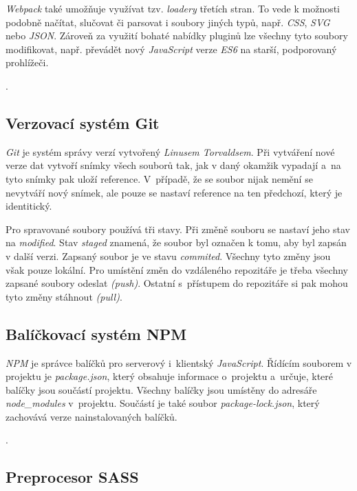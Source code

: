 \documentclass[a4paper,12pt]{article}
\begin{document}
\textit{Webpack} také umožňuje využívat tzv. \textit{loadery} třetích stran. To vede k možnosti podobně načítat, slučovat či parsovat i soubory jiných typů, např. \textit{CSS}, \textit{SVG} nebo \textit{JSON}. Zároveň za využití bohaté nabídky pluginů lze všechny tyto soubory modifikovat, např. převádět nový \textit{JavaScript} verze \textit{ES6} na starší, podporovaný prohlížeči.

.

\subsection{Verzovací systém Git}

\textit{Git} je systém správy verzí vytvořený \textit{Linusem Torvaldsem}. Při vytváření nové verze dat vytvoří snímky všech souborů tak, jak v daný okamžik vypadají a~na tyto snímky pak uloží reference. V~případě, že se soubor nijak nemění se nevytváří nový snímek, ale pouze se nastaví reference na ten předchozí, který je identitický.

Pro spravované soubory používá tři stavy. Při změně souboru se nastaví jeho stav na \textit{modified}. Stav \textit{staged} znamená, že soubor byl označen k tomu, aby byl zapsán v další verzi. Zapsaný soubor je ve stavu \textit{commited}. Všechny tyto změny jsou však pouze lokální. Pro umístění změn do vzdáleného repozitáře je třeba všechny zapsané soubory odeslat \textit{(push)}. Ostatní s~přístupem do repozitáře si pak mohou tyto změny stáhnout \textit{(pull)}.

\subsection{Balíčkovací systém NPM}

\textit{NPM} je správce balíčků pro serverový i~klientský \textit{JavaScript}. Řídícím souborem v projektu je \textit{package.json}, který obsahuje informace o~projektu a~určuje, které balíčky jsou součástí projektu.  Všechny balíčky jsou umístěny do adresáře \textit{node\_modules} v~projektu. Součástí je také soubor \textit{package-lock.json}, který zachovává verze nainstalovaných balíčků.

.

\subsection{Preprocesor SASS}
\end{document}
